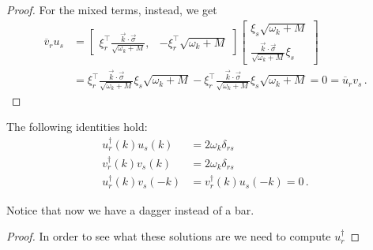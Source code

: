 \documentclass[main.tex]{subfiles}
\begin{document}
\begin{proof}
For the mixed terms, instead, we get 
%
\begin{align}
\overline{v}_{r} u_{s} &= 
\left[\begin{array}{cc}
\displaystyle
\xi_{r}^{\top} \frac{\vec{k} \cdot \vec{\sigma}}{\sqrt{\omega_{k} + M}}, &
-\xi_{r}^{\top} \sqrt{\omega_{k} + M}
\end{array}\right]
\left[\begin{array}{c}
\xi_{s}\sqrt{\omega_{k} + M} \\ 
\displaystyle
\frac{\vec{k} \cdot \vec{\sigma}}{\sqrt{\omega_{k} + M}} 
\xi_{s}
\end{array}\right]  \\
&= \xi_{r}^{\top} \frac{\vec{k} \cdot \vec{\sigma}}{\sqrt{\omega_{k} + M}}
\xi_{s} \sqrt{\omega_{k} +M} - 
\xi_{r}^{\top} \frac{\vec{k} \cdot \vec{\sigma}}{\sqrt{\omega_{k} + M}}
\xi_{s} \sqrt{\omega_{k} +M} = 0 = \overline{u}_{r} v_s
\,.
\end{align}
\end{proof}

\begin{claim}
The following identities hold:
%
\begin{align} 
u_{r}^\dag (k) u_{s}(k) &= 2 \omega_{k}\delta_{rs}  \\
v_{r}^\dag (k) v_{s}(k) &= 2 \omega_{k} \delta_{rs}  \\
u_{r}^\dag (k) v_{s}(-k) &=   
v_{r}^\dag (k) u_{s}(-k) = 0  
\,.
\end{align}

Notice that now we have a dagger instead of a bar.
\end{claim}

\begin{proof}
In order to see what these solutions are we need to compute \(u_{r} ^\dag\) 
\end{proof}
\end{document}
